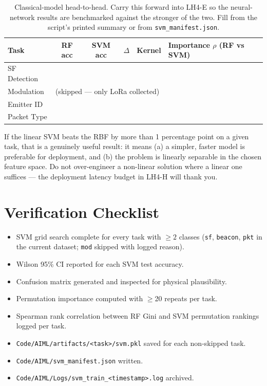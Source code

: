 \documentclass[11pt,letterpaper]{article}
\begin{document}
\begin{table}[h!]
	\centering
	\renewcommand{\arraystretch}{1.4}
	\begin{tabularx}{\textwidth}{l c c c c X}
		\toprule
		\textbf{Task} & \textbf{RF acc} & \textbf{SVM acc} & \textbf{$\Delta$} & \textbf{Kernel} & \textbf{Importance $\rho$ (RF vs SVM)} \\
		\midrule
		SF Detection     & & & & & \\
		Modulation       & \multicolumn{5}{l}{(skipped --- only LoRa collected)} \\
		Emitter ID       & & & & & \\
		Packet Type      & & & & & \\
		\bottomrule
	\end{tabularx}
	\caption{Classical-model head-to-head. Carry this forward into LH4-E so the neural-network results are benchmarked against the stronger of the two. Fill from the script's printed summary or from \texttt{svm\_manifest.json}.}
\end{table}

\begin{tcolorbox}[infobox={When the Linear Kernel Wins}]
	If the linear \mbox{SVM} beats the \mbox{RBF} by more than 1 percentage point on a given task, that is a genuinely useful result: it means (a) a simpler, faster model is preferable for deployment, and (b) the problem is linearly separable in the chosen feature space. Do not over-engineer a non-linear solution where a linear one suffices --- the deployment latency budget in LH4-H will thank you.
\end{tcolorbox}

\section{Verification Checklist}
\begin{itemize}[leftmargin=2em]
	\item[$\square$] \mbox{SVM} grid search complete for every task with $\geq 2$ classes (\texttt{sf}, \texttt{beacon}, \texttt{pkt} in the current dataset; \texttt{mod} skipped with logged reason).
	\item[$\square$] Wilson 95\% CI reported for each \mbox{SVM} test accuracy.
	\item[$\square$] Confusion matrix generated and inspected for physical plausibility.
	\item[$\square$] Permutation importance computed with $\geq$20 repeats per task.
	\item[$\square$] Spearman rank correlation between RF Gini and \mbox{SVM} permutation rankings logged per task.
	\item[$\square$] \texttt{Code/AIML/artifacts/<task>/svm.pkl} saved for each non-skipped task.
	\item[$\square$] \texttt{Code/AIML/svm\_manifest.json} written.
	\item[$\square$] \texttt{Code/AIML/Logs/svm\_train\_<timestamp>.log} archived.
\end{itemize}
\end{document}
